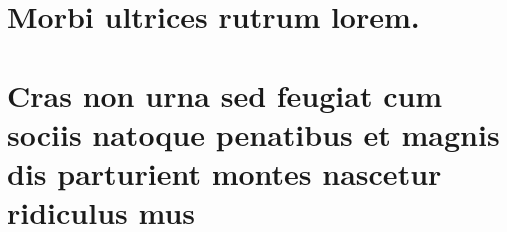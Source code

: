 %
\begin{anexosenv}
%
\partanexos
%
\chapter{Morbi ultrices rutrum lorem.}
\lipsum[30]
%
\chapter{Cras non urna sed feugiat cum sociis natoque penatibus et magnis dis parturient montes nascetur ridiculus mus}
%
\lipsum[31]
%


\end{anexosenv}
%
%
%


